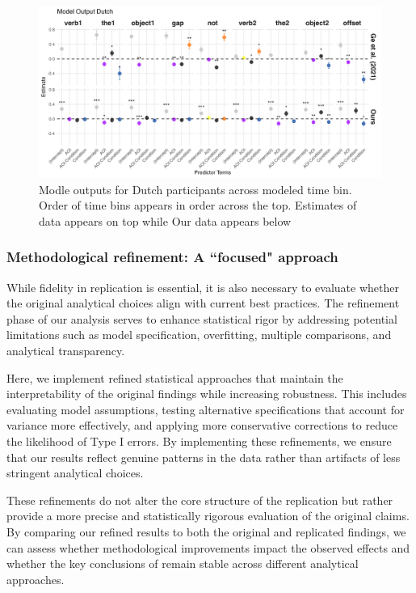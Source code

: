 \begin{figure}[H]  %
    \centering
    \includegraphics[width=\textwidth,height=\textheight,keepaspectratio]{viz/model_plot_dutch.png}
    \caption{Modle outputs for Dutch participants across modeled time bin. Order of time bins appears in order across the top. Estimates of \cite{Ge2021} data appears on top while Our data appears below}
    \label{fig:model_plot_dutch}
\end{figure}


\subsubsection{Methodological refinement: A ``focused" approach}

While fidelity in replication is essential, it is also necessary to evaluate whether the original analytical choices align with current best practices. The refinement phase of our analysis serves to enhance statistical rigor by addressing potential limitations such as model specification, overfitting, multiple comparisons, and analytical transparency.

Here, we implement refined statistical approaches that maintain the interpretability of the original findings while increasing robustness. This includes evaluating model assumptions, testing alternative specifications that account for variance more effectively, and applying more conservative corrections to reduce the likelihood of Type I errors. By implementing these refinements, we ensure that our results reflect genuine patterns in the data rather than artifacts of less stringent analytical choices.

These refinements do not alter the core structure of the replication but rather provide a more precise and statistically rigorous evaluation of the original claims. By comparing our refined results to both the original and replicated findings, we can assess whether methodological improvements impact the observed effects and whether the key conclusions of \cite{Ge2021} remain stable across different analytical approaches.

